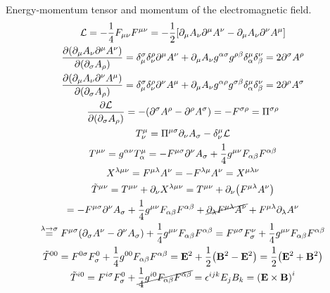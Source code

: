 \documentclass{report}
\begin{document}
\begin{subquests}
	\item Energy-momentum tensor and momentum of the electromagnetic field.
	\begin{gather*}
		{\cal L} = -\frac{1}{4}F_{\mu\nu}F^{\mu\nu} = -\frac{1}{2}\bqty{\partial_{\mu}A_{\nu}\partial^{\mu}A^{\nu} - \partial_{\mu}A_{\nu}\partial^{\nu}A^{\mu}} \\
		\pdv{\pqty{\partial_{\mu}A_{\nu}\partial^{\mu}A^{\nu}}}{\pqty{\partial_{\sigma}A_{\rho}}} = \delta^{\sigma}_{\mu}\delta^{\rho}_{\nu}\partial^{\mu}A^{\nu} + \partial_{\mu}A_{\nu}g^{\alpha\sigma}g^{\rho\beta}\delta^{\mu}_{\alpha}\delta^{\nu}_{\beta}= 2\partial^{\sigma}A^{\rho} \\
		\pdv{\pqty{\partial_{\mu}A_{\nu}\partial^{\nu}A^{\mu}}}{\pqty{\partial_{\sigma}A_{\rho}}} = \delta^{\sigma}_{\mu}\delta^{\rho}_{\nu}\partial^{\nu}A^{\mu} + \partial_{\mu}A_{\nu}g^{\alpha\rho}g^{\sigma\beta}\delta^{\mu}_{\alpha}\delta^{\nu}_{\beta}= 2\partial^{\rho}A^{\sigma} \\
		\pdv{\cal L}{\pqty{\partial_{\sigma}A_{\rho}}} = -\pqty{\partial^{\sigma}A^{\rho} - \partial^{\rho}A^{\sigma}} = - F^{\sigma\rho} = \Pi^{\sigma\rho} \\
		T^{\mu}_{\nu} = \Pi^{\mu\sigma}\partial_{\nu}A_{\sigma} - \delta^{\mu}_{\nu}{\cal L} \\
		T^{\mu\nu} = g^{\alpha\nu}T^{\mu}_{\alpha} = -F^{\mu\sigma}\partial^{\nu}A_{\sigma} + \frac{1}{4}g^{\mu\nu}F_{\alpha\beta}F^{\alpha\beta} \\
		X^{\lambda\mu\nu} = F^{\mu\lambda}A^{\nu} = -F^{\lambda\mu}A^{\nu} = X^{\mu\lambda\nu} \\
		\tilde{T}^{\mu\nu} = T^{\mu\nu} + \partial_{\nu}X^{\lambda\mu\nu} = T^{\mu\nu} + \partial_{\nu}\pqty{F^{\mu\lambda}A^{\nu}} \\
		= -F^{\mu\sigma}\partial^{\nu}A_{\sigma} + \frac{1}{4}g^{\mu\nu}F_{\alpha\beta}F^{\alpha\beta} + \cancel{\partial_\lambda F^{\mu\lambda}A^{\nu}} + F^{\mu\lambda}\partial_{\lambda}A^{\nu} \\
		\stackrel{\lambda\to\sigma}{=} F^{\mu\sigma}\pqty{\partial_{\sigma}A^{\nu} - \partial^{\nu}A_{\sigma}} + \frac{1}{4}g^{\mu\nu}F_{\alpha\beta}F^{\alpha\beta} = F^{\mu\sigma}F^{\nu}_{\sigma} + \frac{1}{4}g^{\mu\nu}F_{\alpha\beta}F^{\alpha\beta} \\ 
		\tilde{T}^{00} = F^{0\sigma}F^0_{\sigma} + \frac{1}{4}g^{00}F_{\alpha\beta}F^{\alpha\beta} = {\vb E}^2 + \frac{1}{2}\pqty{{\vb B}^2 - {\vb E}^2} = \frac{1}{2}\pqty{{\vb E}^2 + {\vb B}^2} \\
		\tilde{T}^{i0} = F^{i\sigma}F^0_\sigma + \cancel{\frac{1}{4}g^{i0}F_{\alpha\beta}F^{\alpha\beta}} = \epsilon^{ijk}E_j B_k = \pqty{\vb E \times \vb B}^i
	\end{gather*}
\end{subquests}
\end{document}
